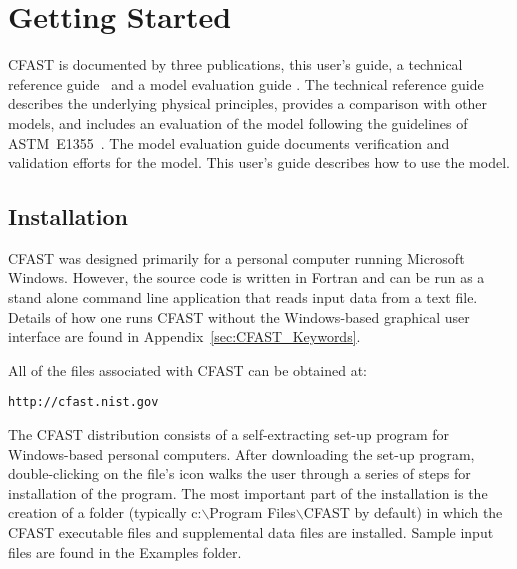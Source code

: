 
\chapter{Getting Started}

CFAST is documented by three publications, this user's guide, a technical reference guide~\cite{CFAST_Tech_Guide_7} and a model evaluation guide \cite{CFAST_Valid_Guide_7}. The technical reference guide describes the underlying physical principles, provides a comparison with other models, and includes an evaluation of the model following the guidelines of ASTM~E1355~\cite{ASTM:E1355}. The model evaluation guide documents verification and validation efforts for the model. This user's guide describes how to use the model.

\section{Installation}

CFAST was designed primarily for a personal computer running Microsoft Windows. However, the source code is written in Fortran and can be run as a stand alone command line application that reads input data from a text file. Details of how one runs CFAST without the Windows-based graphical user interface are found in Appendix~\ref{sec:CFAST_Keywords}. 

All of the files associated with CFAST can be obtained at:
\begin{lstlisting}
http://cfast.nist.gov
\end{lstlisting}
The CFAST distribution consists of a self-extracting set-up program for Windows-based personal computers. After downloading the set-up program, double-clicking on the file's icon walks the user through a series of steps for installation of the program.  The most important part of the installation is the creation of a folder (typically {\ct c:$\backslash$Program Files$\backslash$CFAST} by default) in which the CFAST executable files and supplemental data files are installed.  Sample input files are found in the {\ct Examples} folder.

